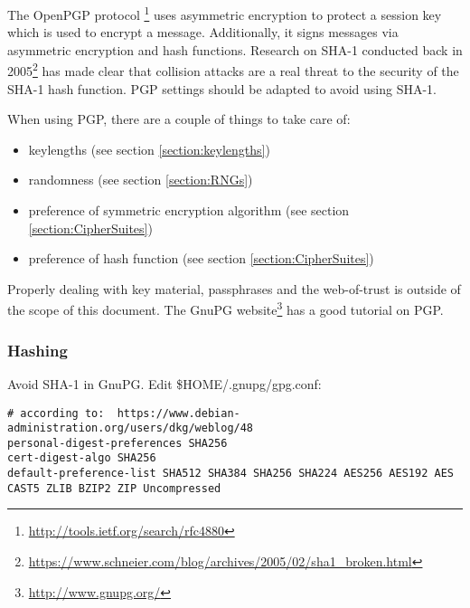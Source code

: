The OpenPGP protocol
\footnote{\url{http://tools.ietf.org/search/rfc4880}}
 uses asymmetric encryption to protect a session key which is used to encrypt a message. Additionally, it signs messages via asymmetric encryption and hash functions. %
Research on SHA-1 conducted back in 2005\footnote{\url{https://www.schneier.com/blog/archives/2005/02/sha1\_broken.html}} has made clear that collision attacks are a real threat to the security of the SHA-1 hash function. PGP settings should be adapted to avoid using SHA-1.


When using PGP, there are a couple of things to take care of:
\begin{itemize}
\item keylengths (see section \ref{section:keylengths})
\item randomness (see section \ref{section:RNGs})
\item preference of symmetric encryption algorithm (see section \ref{section:CipherSuites})
\item preference of hash function (see section \ref{section:CipherSuites})
\end{itemize}

Properly dealing with key material, passphrases and the web-of-trust is outside of the scope of this document. The GnuPG website\footnote{\url{http://www.gnupg.org/}} has a good tutorial on PGP.

\subsubsection{Hashing}
Avoid SHA-1 in GnuPG. Edit \$HOME/.gnupg/gpg.conf:

\begin{lstlisting}
# according to:  https://www.debian-administration.org/users/dkg/weblog/48
personal-digest-preferences SHA256
cert-digest-algo SHA256
default-preference-list SHA512 SHA384 SHA256 SHA224 AES256 AES192 AES CAST5 ZLIB BZIP2 ZIP Uncompressed
\end{lstlisting}




